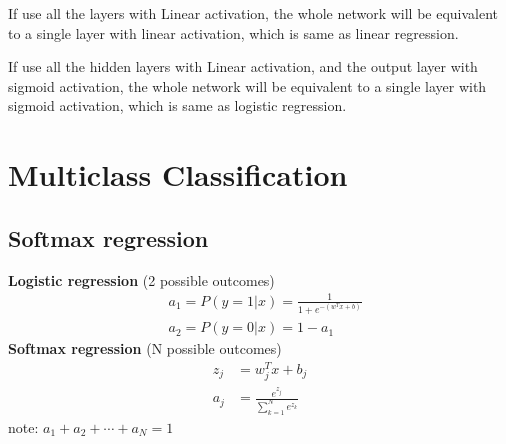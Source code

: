\vspace{2em}
\begin{notebox}
    \hspace{2em}If use all the layers with Linear activation, 
    the whole network will be equivalent to a single layer with linear activation, which is same as linear regression.
    \par
    \hspace{2em}If use all the hidden layers with Linear activation, and the output layer with sigmoid activation,
    the whole network will be equivalent to a single layer with sigmoid activation, which is same as logistic regression.
\end{notebox}

\section{Multiclass Classification}
\subsection*{Softmax regression}
\noindent
\textbf{Logistic regression} (2 possible outcomes)
\begin{align*}
    &a_1 = P(y=1|x) = \frac{1}{1 + e^{-(w^Tx + b)}}\\
    &a_2 = P(y=0|x) = 1 - a_1
\end{align*}
\textbf{Softmax regression} (N possible outcomes)
\begin{align*}
    z_j &= w_j^Tx + b_j\\
    a_j &= \frac{e^{z_j}}{\sum_{k=1}^{N}e^{z_k}}
\end{align*}
note: $a_1 + a_2 + \cdots + a_N = 1$

